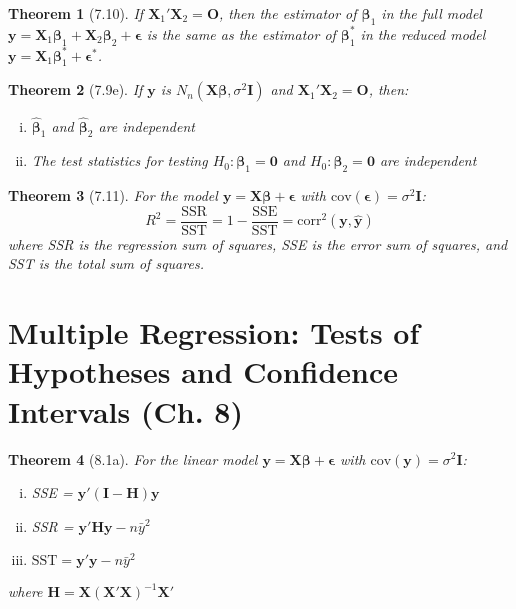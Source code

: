 \documentclass{article}
\newtheorem{theorem}{Theorem}[section]
\begin{document}
\begin{theorem}[7.10]
If $\mathbf{X}_1'\mathbf{X}_2 = \mathbf{O}$, then the estimator of $\boldsymbol{\beta}_1$ in the full model $\mathbf{y} = \mathbf{X}_1\boldsymbol{\beta}_1 + \mathbf{X}_2\boldsymbol{\beta}_2 + \boldsymbol{\epsilon}$ is the same as the estimator of $\boldsymbol{\beta}_1^*$ in the reduced model $\mathbf{y} = \mathbf{X}_1\boldsymbol{\beta}_1^* + \boldsymbol{\epsilon}^*$.
\end{theorem}

\begin{theorem}[7.9e]
If $\mathbf{y}$ is $N_n(\mathbf{X}\boldsymbol{\beta}, \sigma^2\mathbf{I})$ and $\mathbf{X}_1'\mathbf{X}_2 = \mathbf{O}$, then:
\begin{enumerate}[(i)]
\item $\hat{\boldsymbol{\beta}}_1$ and $\hat{\boldsymbol{\beta}}_2$ are independent
\item The test statistics for testing $H_0: \boldsymbol{\beta}_1 = \mathbf{0}$ and $H_0: \boldsymbol{\beta}_2 = \mathbf{0}$ are independent
\end{enumerate}
\end{theorem}

\begin{theorem}[7.11]
For the model $\mathbf{y} = \mathbf{X}\boldsymbol{\beta} + \boldsymbol{\epsilon}$ with $\text{cov}(\boldsymbol{\epsilon}) = \sigma^2\mathbf{I}$:
\[R^2 = \frac{\text{SSR}}{\text{SST}} = 1 - \frac{\text{SSE}}{\text{SST}} = \text{corr}^2(\mathbf{y}, \hat{\mathbf{y}})\]
where SSR is the regression sum of squares, SSE is the error sum of squares, and SST is the total sum of squares.
\end{theorem}

\section{Multiple Regression: Tests of Hypotheses and Confidence Intervals (Ch. 8)}

\begin{theorem}[8.1a]
For the linear model $\mathbf{y} = \mathbf{X}\boldsymbol{\beta} + \boldsymbol{\epsilon}$ with $\text{cov}(\mathbf{y}) = \sigma^2\mathbf{I}$:
\begin{enumerate}[(i)]
\item SSE = $\mathbf{y}'(\mathbf{I}-\mathbf{H})\mathbf{y}$
\item SSR = $\mathbf{y}'\mathbf{H}\mathbf{y} - n\bar{y}^2$
\item $\text{SST} = \mathbf{y}'\mathbf{y} - n\bar{y}^2$
\end{enumerate}
where $\mathbf{H} = \mathbf{X}(\mathbf{X}'\mathbf{X})^{-1}\mathbf{X}'$
\end{theorem}
\end{document}
